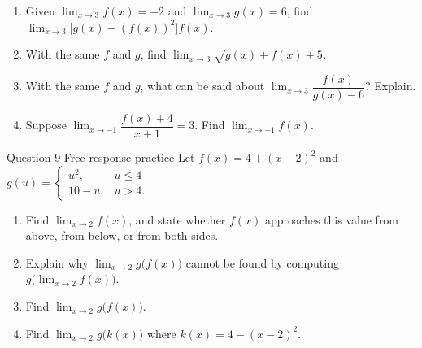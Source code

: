 \documentclass[11pt]{article}
\begin{document}
\begin{enumerate}[leftmargin=*,itemsep=2pt,start=5]
  \item Given $\displaystyle\lim_{x\to 3}f(x)=-2$ and $\displaystyle\lim_{x\to 3}g(x)=6$, find $\displaystyle\lim_{x\to 3}\big[g(x)-(f(x))^2\big]f(x)$.\work{2.8cm}
  \item With the same $f$ and $g$, find $\displaystyle\lim_{x\to 3}\sqrt{g(x)+f(x)+5}$.\work{2.8cm}
  \item With the same $f$ and $g$, what can be said about $\displaystyle\lim_{x\to 3}\dfrac{f(x)}{g(x)-6}$? Explain.\work{2.8cm}
  \item Suppose $\displaystyle\lim_{x\to -1}\dfrac{f(x)+4}{x+1}=3$. Find $\displaystyle\lim_{x\to -1}f(x)$.\work{2.8cm}
\end{enumerate}

\begin{frbox}{Question 9 \textperiodcentered{} Free-response practice}
Let $f(x)=4+(x-2)^2$ and $g(u)=\begin{cases}u^2,&u\le4\\10-u,&u>4.\end{cases}$
\begin{enumerate}[label=(\alph*),leftmargin=*,itemsep=2pt]
  \item Find $\displaystyle\lim_{x\to 2}f(x)$, and state whether $f(x)$ approaches this value from above, from below, or from both sides.\work{2cm}
  \item Explain why $\displaystyle\lim_{x\to 2}g\big(f(x)\big)$ cannot be found by computing $g\big(\displaystyle\lim_{x\to 2}f(x)\big)$.\work{2cm}
  \item Find $\displaystyle\lim_{x\to 2}g\big(f(x)\big)$.\work{2cm}
  \item Find $\displaystyle\lim_{x\to 2}g\big(k(x)\big)$ where $k(x)=4-(x-2)^2$.\work{2cm}
\end{enumerate}
\end{frbox}
\end{document}
